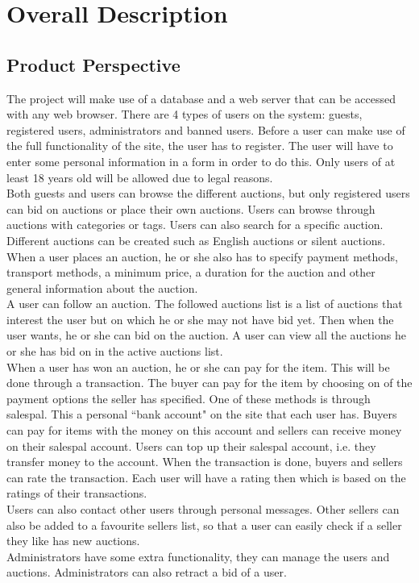 \chapter{Overall Description}

\section{Product Perspective}
	The project will make use of a database and a web server that can be 
	accessed with any web browser. There are 4 types of users on the system:
	guests, registered users, administrators and banned users. Before a user can make use
	of the full functionality of the site, the user has to register. The user
	will have to enter some personal information in a form in order to do this.
	Only users of at least 18 years old will be allowed due to legal reasons.\\
	Both guests and users can browse the different auctions, but only registered 
	users can bid on auctions or place their own auctions. Users can browse through
	auctions with categories or tags. Users can also search for a  specific auction.\\
	Different auctions can be created such as English auctions\cite{English} or
	silent auctions\cite{silent}. When a user places an auction, he or she also has to specify
	payment methods, transport methods, a minimum price, a duration for the auction
	and other general information about the auction.\\
	A user can follow an auction. The followed auctions list is a list of auctions that interest the user
	but on which he or she may not have bid yet. Then when the user wants, he or she can bid on the auction.
	A user can view all the auctions he or she has bid on in the active auctions list.\\
	When a user has won an auction, he or she can pay for the item. This will be done through a 
	transaction. The buyer can pay for the item by choosing on of the payment options the seller 
	has specified. One of these methods is through salespal. This a personal ``bank account" on
	the site that each user has. Buyers can pay for items with the money on this account and 
	sellers can receive money on their salespal account. Users can top up their salespal account,
	i.e. they transfer money to the account. When the transaction is done, buyers and sellers 
	can rate the transaction. Each user will have a rating then which is based on the ratings
	of their transactions. \\
	Users can also contact other users through personal messages. Other sellers can also
	be added to a favourite sellers list, so that a user can easily check if a 
	seller they like has new auctions. \\
	Administrators have some extra functionality, they can manage the users 
	and auctions. Administrators can also retract a bid of a user.

